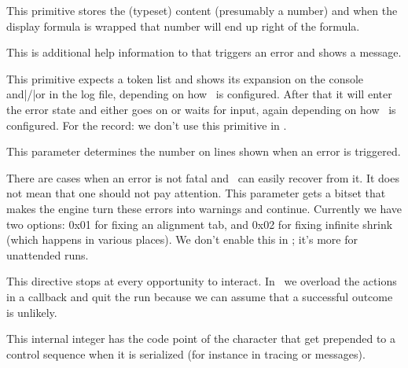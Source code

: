 \stopoldprimitive

\startoldprimitive[title={\prm {eqno}}]

This primitive stores the (typeset) content (presumably a number) and when the
display formula is wrapped that number will end up right of the formula.

\stopoldprimitive

\startoldprimitive[title={\prm {errhelp}}]

This is additional help information to  that triggers an error
and shows a message.

\stopoldprimitive

\startoldprimitive[title={\prm {errmessage}}]

This primitive expects a token list and shows its expansion on the console
and|/|or in the log file, depending on how \TEX\ is configured. After that it
will enter the error state and either goes on or waits for input, again depending
on how \TEX\ is configured. For the record: we don't use this primitive in
\CONTEXT.

\stopoldprimitive

\startoldprimitive[title={\prm {errorcontextlines}}]

This parameter determines the number on lines shown when an error is triggered.

\stopoldprimitive

\startnewprimitive[title={\prm {errorrecoverymode}}]

There are cases when an error is not fatal and \TEX\ can easily recover from it.
It does not mean that one should not pay attention. This parameter gets a bitset
that makes the engine turn these errors into warnings and continue. Currently we
have two options: 0x01 for fixing an alignment tab, and 0x02 for fixing infinite
shrink (which happens in various places). We don't enable this in \CONTEXT; it's
more for unattended runs.

\stopnewprimitive

\startoldprimitive[title={\prm {errorstopmode}}]

This directive stops at every opportunity to interact. In \CONTEXT\ we overload
the actions in a callback and quit the run because we can assume that a
successful outcome is unlikely.

\stopoldprimitive

\startoldprimitive[title={\prm {escapechar}}]

This internal integer has the code point of the character that get prepended to a
control sequence when it is serialized (for instance in tracing or messages).

